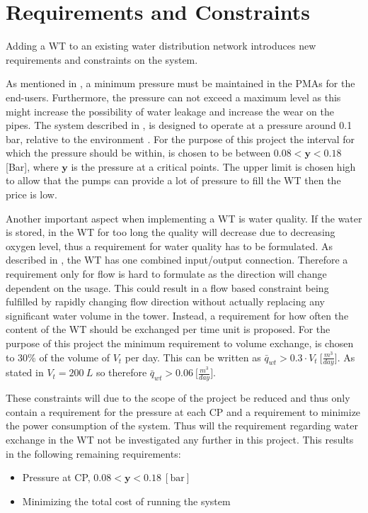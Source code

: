 \chapter{Requirements and Constraints}
\label{Requirements_and_constraints}

Adding a WT to an existing water distribution network introduces new requirements and constraints on the system. 

As mentioned in , a minimum pressure must be maintained in the PMAs for the end-users. Furthermore, the pressure can not exceed a maximum level as this might increase the possibility of water leakage and increase the wear on the pipes. The system described in , is designed to operate at a pressure around 0.1 bar, relative to the environment \cite{master_aau}. For the purpose of this project the interval for which the pressure should be within, is chosen to be between $0.08 < \bm{y} < 0.18$ [Bar], where $\bm{y}$ is the pressure at a critical points. The upper limit is chosen high to allow that the pumps can provide a lot of pressure to fill the WT then the price is low. 

Another important aspect when implementing a WT is water quality. If the water is stored, in the WT for too long the quality will decrease due to decreasing oxygen level, thus a requirement for water quality has to be formulated. As described in , the WT has one combined input/output connection. Therefore a requirement only for flow is hard to formulate as the direction will change dependent on the usage. This could result in a flow based constraint being fulfilled by rapidly changing flow direction without actually replacing any significant water volume in the tower. Instead, a requirement for how often the content of the WT should be exchanged per time unit is proposed. For the purpose of this project the minimum requirement to volume exchange, is chosen to 30\% of the volume of $V_t$ per day. This can be written as $\bar{q}_{wt} > 0.3\cdot V_t \: \big[\frac{m^3}{day}\big]$. As stated in  $V_t = 200 \:L$ so therefore $\bar{q}_{wt} > 0.06 \: \big[\frac{m^3}{day}\big]$.

These constraints will due to the scope of the project be reduced and thus only contain a requirement for the pressure at each CP and a requirement to minimize the power consumption of the system. Thus will the requirement regarding water exchange in the WT not be investigated any further in this project. 
This results in the following remaining requirements:

\begin{itemize}
	\item Pressure at CP, $0.08 < \bm{y} < 0.18 \:[\text{bar}]$
%
	\item Minimizing the total cost of running the system
\end{itemize}
 